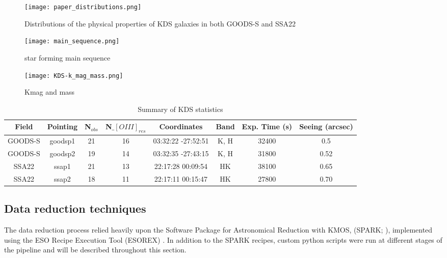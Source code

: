 \documentclass[a4paper,fleqn,usenatbib]{mn2e}
\begin{document}

\begin{figure}
\centering
\texttt{[image: paper\_distributions.png]}
\caption{Distributions of the physical properties of KDS galaxies in both GOODS-S and SSA22}
\label{fig:distributions}
\end{figure}

\begin{figure}
\centering
\texttt{[image: main\_sequence.png]}
\caption{star forming main sequence}
\label{fig:distributions}
\end{figure}

\begin{figure}
\centering
\texttt{[image: KDS-k\_mag\_mass.png]}
\caption{Kmag and mass}
\label{fig:distributions}
\end{figure}

\begin{table*}\label{tab:pointings}
    \centering
\begin{tabular}{ c c c c c c c c }

 \hline
Field & Pointing & N$_{obs}$ & N$\_[OIII]_{res}$ & Coordinates & Band & Exp. Time (s) & Seeing (arcsec)  \\
 \hline
 GOODS-S & goodsp1 & 21 & 16 & 03:32:22 -27:52:51 & K, H & 32400 & 0.5 \\
GOODS-S & goodsp2 & 19 & 14 & 03:32:35 -27:43:15 & K, H & 31800 & 0.52 \\
SSA22 & ssap1 & 21 & 13 & 22:17:28 00:09:54 & HK & 38100 & 0.65 \\
SSA22 & ssap2 & 18 & 11 & 22:17:11 00:15:47 & HK & 27800 & 0.70 \\
 \hline
\end{tabular}
\caption{Summary of KDS statistics}
\end{table*}


\subsection{Data reduction techniques}\label{subsec:datareduction}
The data reduction process relied heavily upon the Software Package for Astronomical Reduction with KMOS, (SPARK; \cite{Davies2013}), implemented using the ESO Recipe Execution Tool (ESOREX) \citep{Freudling2013}.
In addition to the SPARK recipes, custom python scripts were run at different stages of the pipeline and will be described throughout this section.
\end{document}
